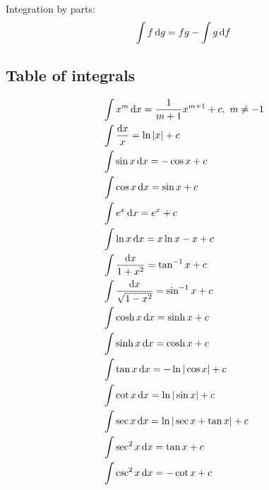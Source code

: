 \noindent Integration by parts:
\begin{equation*} \int f \operatorname{d\!} g = fg - \int g \operatorname{d\!} f \end{equation*}

\subsection{Table of integrals}

\begin{align*}
&\int x^m\der x = \frac{1}{m+1}x^{m+1}+c,\ m\ne -1\\
&\int \frac{\der x}{x} = \ln |x|+c\\
&\int \sin x\der x = -\cos x+c\\
&\int \cos x\der x = \sin x+c\\
&\int e^x\der x = e^x +c\\
&\int \ln x \der x = x \ln x - x+c\\
&\int \frac{\der x}{1+x^2}  = \tan^{-1} x+c\\
&\int \frac{\der x}{\sqrt{1-x^2}}  = \sin^{-1} x+c\\
&\int \cosh x \der x = \sinh x+c\\
&\int \sinh x \der x = \cosh x+c\\
&\int \tan x\der x = -\ln|\cos x|+c\\
&\int \cot x\der x = \ln|\sin x|+c\\
&\int \sec x\der x = \ln|\sec x +\tan x| +c\\
&\int \sec ^2 x\der x = \tan x +c\\
&\int \csc ^2 x\der x = -\cot x +c
\end{align*}
